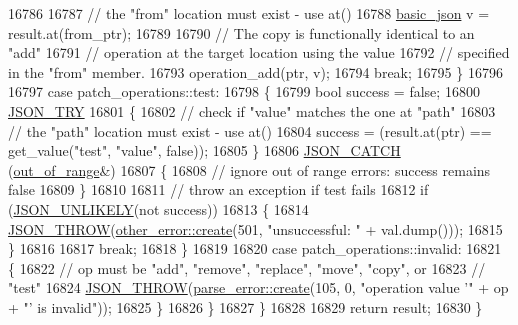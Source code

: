 \begin{DoxyCode}
16786 
16787                     \textcolor{comment}{// the "from" location must exist - use at()}
16788                     \hyperlink{classnlohmann_1_1basic__json_aed115142bd0c6c66c864700e0467df55}{basic\_json} v = result.at(from\_ptr);
16789 
16790                     \textcolor{comment}{// The copy is functionally identical to an "add"}
16791                     \textcolor{comment}{// operation at the target location using the value}
16792                     \textcolor{comment}{// specified in the "from" member.}
16793                     operation\_add(ptr, v);
16794                     \textcolor{keywordflow}{break};
16795                 \}
16796 
16797                 \textcolor{keywordflow}{case} patch\_operations::test:
16798                 \{
16799                     \textcolor{keywordtype}{bool} success = \textcolor{keyword}{false};
16800                     \hyperlink{json_8hpp_a985d3b82445302c57257f6432f261fe9}{JSON\_TRY}
16801                     \{
16802                         \textcolor{comment}{// check if "value" matches the one at "path"}
16803                         \textcolor{comment}{// the "path" location must exist - use at()}
16804                         success = (result.at(ptr) == get\_value(\textcolor{stringliteral}{"test"}, \textcolor{stringliteral}{"value"}, \textcolor{keyword}{false}));
16805                     \}
16806                     \hyperlink{json_8hpp_a6954bec49ed2a2dfb938c1131c82740a}{JSON\_CATCH} (\hyperlink{classnlohmann_1_1basic__json_a28f7c2f087274a0012eb7a2333ee1580}{out\_of\_range}&)
16807                     \{
16808                         \textcolor{comment}{// ignore out of range errors: success remains false}
16809                     \}
16810 
16811                     \textcolor{comment}{// throw an exception if test fails}
16812                     \textcolor{keywordflow}{if} (\hyperlink{json_8hpp_ab77582407c64944e7db1ea95ab520253}{JSON\_UNLIKELY}(not success))
16813                     \{
16814                         \hyperlink{json_8hpp_a6c274f6db2e65c1b66c7d41b06ad690f}{JSON\_THROW}(\hyperlink{classnlohmann_1_1detail_1_1other__error_a87e8ab894e8c85c0d97a0919782d3683}{other\_error::create}(501, \textcolor{stringliteral}{"unsuccessful: "} +
       val.dump()));
16815                     \}
16816 
16817                     \textcolor{keywordflow}{break};
16818                 \}
16819 
16820                 \textcolor{keywordflow}{case} patch\_operations::invalid:
16821                 \{
16822                     \textcolor{comment}{// op must be "add", "remove", "replace", "move", "copy", or}
16823                     \textcolor{comment}{// "test"}
16824                     \hyperlink{json_8hpp_a6c274f6db2e65c1b66c7d41b06ad690f}{JSON\_THROW}(\hyperlink{classnlohmann_1_1detail_1_1parse__error_a9fd60ad6bce80fd99686ad332faefd37}{parse\_error::create}(105, 0, \textcolor{stringliteral}{"operation value '"}
       + op + \textcolor{stringliteral}{"' is invalid"}));
16825                 \}
16826             \}
16827         \}
16828 
16829         \textcolor{keywordflow}{return} result;
16830     \}
\end{DoxyCode}
